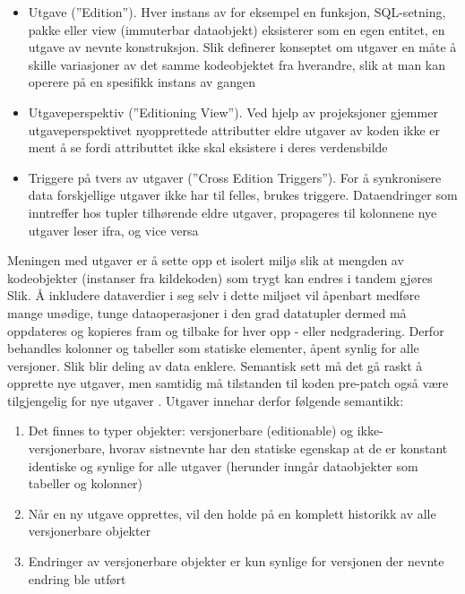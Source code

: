 \begin{itemize}
  \item Utgave (''Edition''). Hver instans av for eksempel en funksjon, SQL-setning, pakke eller view (immuterbar dataobjekt) eksisterer som en egen entitet, en utgave av nevnte konstruksjon. Slik definerer konseptet om utgaver en måte å skille variasjoner av det samme kodeobjektet fra hverandre, slik at man kan operere på en spesifikk instans av gangen
  \item Utgaveperspektiv (''Editioning View''). Ved hjelp av projeksjoner gjemmer utgaveperspektivet nyopprettede attributter eldre utgaver av koden ikke er ment å se fordi attributtet ikke skal eksistere i deres verdensbilde
  \item Triggere på tvers av utgaver (''Cross Edition Triggers''). For å synkronisere data forskjellige utgaver ikke har til felles, brukes triggere. Dataendringer som inntreffer hos tupler tilhørende eldre utgaver, propageres til kolonnene nye utgaver leser ifra, og vice versa
\end{itemize}

Meningen med utgaver er å sette opp et isolert miljø slik at mengden av kodeobjekter (instanser fra kildekoden) som trygt kan endres i tandem gjøres Slik. Å inkludere dataverdier i seg selv i dette miljøet vil åpenbart medføre mange unødige, tunge dataoperasjoner i den grad datatupler dermed må oppdateres og kopieres fram og tilbake for hver opp - eller nedgradering. Derfor behandles kolonner og tabeller som statiske elementer, åpent synlig for alle versjoner. Slik blir deling av data enklere. Semantisk sett må det gå raskt å opprette nye utgaver, men samtidig må tilstanden til koden pre-patch også være tilgjengelig for nye utgaver \citep{choi2009}. Utgaver innehar derfor følgende semantikk:

\begin{enumerate}
  \item Det finnes to typer objekter: versjonerbare (editionable) og ikke-versjonerbare, hvorav sistnevnte har den statiske egenskap at de er konstant identiske og synlige for alle utgaver (herunder inngår dataobjekter som tabeller og kolonner)
  \item Når en ny utgave opprettes, vil den holde på en komplett historikk av alle versjonerbare objekter
  \item Endringer av versjonerbare objekter er kun synlige for versjonen der nevnte endring ble utført
\end{enumerate}

